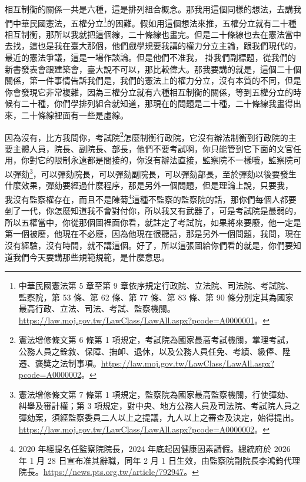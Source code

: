 \hypertarget{w05:cue:13}{}相互制衡的關係一共是六種，這是排列組合概念。那我用這個同樣的想法，去講我們中華民國憲法，五權分立\footnote{中華民國憲法第 5 章至第 9 章依序規定行政院、立法院、司法院、考試院、監察院，第 53 條、第 62 條、第 77 條、第 83 條、第 90 條分別定其為國家最高行政、立法、司法、考試、監察機關。\url{https://law.moj.gov.tw/LawClass/LawAll.aspx?pcode=A0000001}。}的困難。假如用這個想法來推，五權分立就有二十種相互制衡，那所以我就把這個線，二十條線也畫完。但是二十條線也去在憲法當中去找，這也是我在臺大那個，他們戲學規要我講的權力分立主論，跟我們現代的，最近的憲法爭議，這是一場作談論。但是他們不准我，
\hypertarget{w05:cue:14}{}掛我們副標題，從我們的新書發表會跟建築會，臺大說不可以，那比較偉大。那我要講的就是，這個二十個關係，第一件事情告訴我們是，我們的憲法上的權力分立，沒有本質的不同，但是你會發現它非常複雜，因為三權分立就有六種相互制衡的關係，等到五權分立的時候有二十種，你們學排列組合就知道，那現在的問題是二十種，二十條線我畫得出來，二十條線裡面有一些是虛線。

\hypertarget{w05:cue:15}{}因為沒有，比方我問你，考試院\footnote{憲法增修條文第 6 條第 1 項規定，考試院為國家最高考試機關，掌理考試，公務人員之銓敘、保障、撫卹、退休，以及公務人員任免、考績、級俸、陞遷、褒獎之法制事項。\url{https://law.moj.gov.tw/LawClass/LawAll.aspx?pcode=A0000002}。}怎麼制衡行政院，它沒有辦法制衡到行政院的主要主體人員，院長、副院長、部長，他們不要考試啊，你只能管到它下面的文官任用，你對它的限制永遠都是間接的，你沒有辦法直接，監察院不一樣哦，監察院可以彈劾\footnote{憲法增修條文第 7 條第 1 項規定，監察院為國家最高監察機關，行使彈劾、糾舉及審計權；第 3 項規定，對中央、地方公務人員及司法院、考試院人員之彈劾案，須經監察委員二人以上之提議，九人以上之審查及決定，始得提出。\url{https://law.moj.gov.tw/LawClass/LawAll.aspx?pcode=A0000002}。}，可以彈劾院長，可以彈劾副院長，可以彈劾部長，至於彈劾以後要發生什麼效果，彈劾要經過什麼程序，那是另外一個問題，但是理論上說，只要我，
\hypertarget{w05:cue:16}{}我沒有監察權存在，而且不是陳菊\footnote{2020 年經提名任監察院院長，2024 年底起因健康因素請假。總統府於 2026 年 1 月 28 日宣布准其辭職，同年 2 月 1 日生效，由監察院副院長李鴻鈞代理院長。\url{https://news.pts.org.tw/article/792947}。}這種不監察的監察院的話，那你們每個人都要剉了一代，你怎麼知道我不會對付你，所以我又有武器了，可是考試院是最弱的，所以五權當中，你從那個圖裡面你看，就註定了考試院，如果將來要廢，他一定是第一個被廢，他現在不必廢，因為他現在很聽話，那是另外一個問題，我問，現在沒有經驗，沒有時間，就不講這個。好了，所以這張圖給你們看的就是，你們要知道我們今天要講那些規範規範，是什麼意思。

